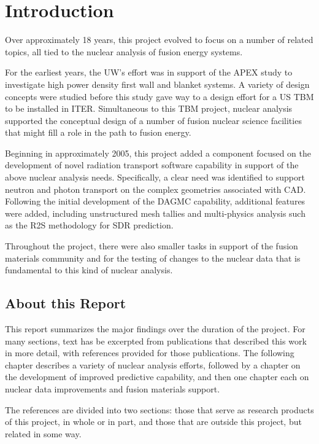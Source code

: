 \chapter{Introduction}

Over approximately 18 years, this project evolved to focus on a number of
related topics, all tied to the nuclear analysis of fusion energy systems.

For the earliest years, the \gls{UW}'s effort was in support of the \gls{APEX}
study to investigate high power density first wall and blanket systems.  A
variety of design concepts were studied before this study gave way to a
design effort for a US \gls{TBM} to be installed in ITER.  Simultaneous to
this \gls{TBM} project, nuclear analysis supported the conceptual design of a
number of fusion nuclear science facilities that might fill a role in the path
to fusion energy.

Beginning in approximately 2005, this project added a component focused on the
development of novel radiation transport software capability in support of the
above nuclear analysis needs.  Specifically, a clear need was identified to
support neutron and photon transport on the complex geometries associated with
\gls{CAD}.  Following the initial development of the \gls{DAGMC} capability,
additional features were added, including unstructured mesh tallies and
multi-physics analysis such as the \gls{R2S} methodology for \gls{SDR}
prediction.

Throughout the project, there were also smaller tasks in support of the fusion
materials community and for the testing of changes to the nuclear data that is
fundamental to this kind of nuclear analysis.

\section{About this Report}

This report summarizes the major findings over the duration of the project.
For many sections, text has be excerpted from publications that described this
work in more detail, with references provided for those publications.  The
following chapter describes a variety of nuclear analysis efforts, followed by
a chapter on the development of improved predictive capability, and then one
chapter each on nuclear data improvements and fusion materials support.

The references are divided into two sections: those that serve as research
products of this project, in whole or in part, and those that are outside this
project, but related in some way.
